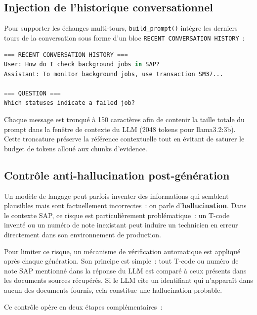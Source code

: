 \subsection{Injection de l’historique conversationnel}

Pour supporter les échanges multi-tours, \texttt{build\_prompt()} intègre les derniers tours de la conversation sous forme d’un bloc \texttt{RECENT CONVERSATION HISTORY}~:

\begin{lstlisting}[language=Python, caption={Injection de l’historique conversationnel}]
=== RECENT CONVERSATION HISTORY ===
User: How do I check background jobs in SAP?
Assistant: To monitor background jobs, use transaction SM37...

=== QUESTION ===
Which statuses indicate a failed job?
\end{lstlisting}

Chaque message est tronqué à 150 caractères afin de contenir la taille totale du prompt dans la fenêtre de contexte du LLM (2048 tokens pour llama3.2:3b). Cette troncature préserve la référence contextuelle tout en évitant de saturer le budget de tokens alloué aux chunks d’evidence.

\subsection{Contrôle anti-hallucination post-génération}

Un modèle de langage peut parfois inventer des informations qui semblent plausibles mais sont factuellement incorrectes~: on parle d'\textbf{hallucination}. Dans le contexte SAP, ce risque est particulièrement problématique~: un T-code inventé ou un numéro de note inexistant peut induire un technicien en erreur directement dans son environnement de production.

Pour limiter ce risque, un mécanisme de vérification automatique est appliqué après chaque génération. Son principe est simple~: tout T-code ou numéro de note SAP mentionné dans la réponse du LLM est comparé à ceux présents dans les documents sources récupérés. Si le LLM cite un identifiant qui n'apparaît dans aucun des documents fournis, cela constitue une hallucination probable.

Ce contrôle opère en deux étapes complémentaires~:

